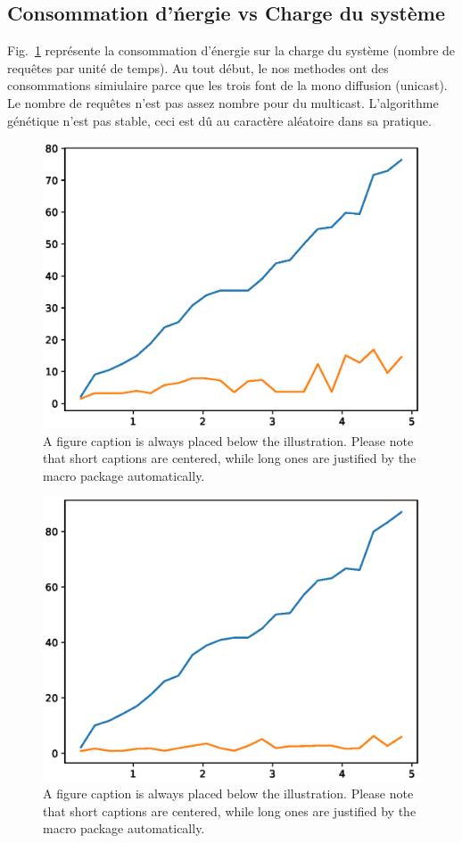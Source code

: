 \documentclass[runningheads]{llncs}
\begin{document}
\subsection{Consommation d'\'nergie vs Charge du syst\`eme}
Fig.~\ref{fig:evslm4} repr\'esente la consommation d'énergie sur 
la charge du système (nombre de requêtes par unit\'e de temps).
Au tout début, le nos methodes ont des consommations simiulaire parce que les
trois font de la mono diffusion (unicast). Le nombre de requêtes n'est pas 
assez nombre pour du multicast.
L'algorithme g\'en\'etique n'est pas stable, ceci est dû au caract\`ere 
aléatoire dans sa pratique.
\begin{figure}[H]
    
    \includegraphics[width=\textwidth]{EvsL.eps}
    \caption{A figure caption is always placed below the illustration.
    Please note that short captions are centered, while long ones are
    justified by the macro package automatically.} 
    \label{fig:evslm4}
\end{figure}

\begin{figure}[H]
    \includegraphics[width=\textwidth]{EvsL1.eps}
    \caption{A figure caption is always placed below the illustration.
    Please note that short captions are centered, while long ones are
    justified by the macro package automatically.} \label{fig1}
\end{figure}
\end{document}
